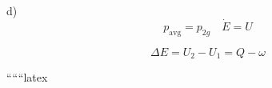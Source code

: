d)
\[
p_{\text{avg}} = p_{2g} \quad \dot{E} = U
\]

\[
\Delta E = U_2 - U_1 = Q - \omega
\]

``````latex